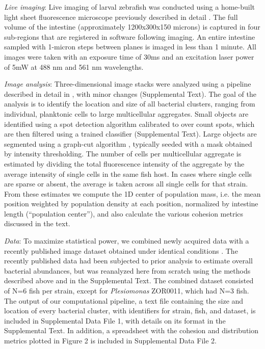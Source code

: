 \textit{Live imaging}: Live imaging of larval zebrafish was conducted using a home-built light sheet fluorescence microscope previously described in detail \cite{Jemielita2014}. The full volume of the intestine (approximately 1200x300x150 microns) is captured in four sub-regions that are registered in software following imaging. An entire intestine sampled with 1-micron steps between planes is imaged in less than 1 minute. All images were taken with an exposure time of 30ms and an excitation laser power of 5mW at 488 nm and 561 nm wavelengths.

\textit{Image analysis}: Three-dimensional image stacks were analyzed using a pipeline described in detail in \cite{Jemielita2014}, with minor changes (Supplemental Text).  The goal of the analysis is to identify the location and size of all bacterial clusters, ranging from individual, planktonic cells to large multicellular aggregates.  Small objects are identified using a spot detection algorithm calibrated to over count spots, which are then filtered using a trained classifier (Supplemental Text).  Large objects are segmented using a graph-cut algorithm \cite{Boykov2004}, typically seeded with a mask obtained by intensity thresholding.  The number of cells per multicellular aggregate is estimated by dividing the total fluorescence intensity of the aggregate by the average intensity of single cells in the same fish host.  In cases where single cells are sparse or absent, the average is taken across all single cells for that strain. From these estimates we compute the 1D center of population mass, i.e. the mean position weighted by population density at each position, normalized by intestine length (``population center''), and also calculate the various cohesion metrics discussed in the text.

\textit{Data}: To maximize statistical power, we combined newly acquired data with a recently published image dataset obtained under identical conditions \cite{Wiles2018}.  The recently published data had been subjected to prior analysis to estimate overall bacterial abundances, but was reanalyzed here from scratch using the methods described above and in the Supplemental Text.  The combined dataset consisted of N=6 fish per strain, except for \textit{Plesiomonas} ZOR0011, which had N=3 fish.  The output of our computational pipeline, a text file containing the size and location of every bacterial cluster, with identifiers for strain, fish, and dataset, is included in Supplemental Data File 1, with details on its format in the Supplemental Text.  In addition, a spreadsheet with the cohesion and distribution metrics plotted in Figure 2 is included in Supplemental Data File 2. 	




